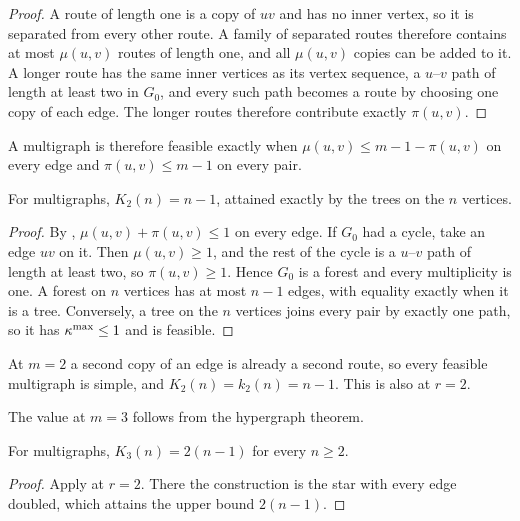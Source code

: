 \begin{proof}
A route of length one is a copy of $uv$ and has no inner vertex, so it is separated from every other route. A family of separated routes therefore contains at most $\mu(u,v)$ routes of length one, and all $\mu(u,v)$ copies can be added to it.
A longer route has the same inner vertices as its vertex sequence, a $u$--$v$ path of length at least two in $G_0$, and every such path becomes a route by choosing one copy of each edge. The longer routes therefore contribute exactly $\pi(u,v)$.
\end{proof}

A multigraph is therefore feasible exactly when $\mu(u,v) \le m-1-\pi(u,v)$ on every edge and $\pi(u,v) \le m-1$ on every pair.

\begin{corollary}[The multigraph vertex value at $m = 2$]\label{cor:multi-vertex-m2}
For multigraphs, $K_2(n) = n-1$, attained exactly by the trees on the $n$ vertices.
\end{corollary}

\begin{proof}
By , $\mu(u,v) + \pi(u,v) \le 1$ on every edge.
If $G_0$ had a cycle, take an edge $uv$ on it. Then $\mu(u,v) \ge 1$, and the rest of the cycle is a $u$--$v$ path of length at least two, so $\pi(u,v) \ge 1$.
Hence $G_0$ is a forest and every multiplicity is one.
A forest on $n$ vertices has at most $n-1$ edges, with equality exactly when it is a tree.
Conversely, a tree on the $n$ vertices joins every pair by exactly one path, so it has $\kappa^{\max}\le1$ and is feasible.
\end{proof}

\begin{remark}\label{rem:multi-vertex-m2-simple}
At $m = 2$ a second copy of an edge is already a second route, so every feasible multigraph is simple, and $K_2(n) = k_2(n) = n-1$. This is also  at $r = 2$.
\end{remark}

The value at $m=3$ follows from the hypergraph theorem.

\begin{corollary}[The multigraph vertex value at $m = 3$]\label{cor:multi-vertex-m3}
For multigraphs, $K_3(n) = 2(n-1)$ for every $n \ge 2$.
\end{corollary}

\begin{proof}
Apply  at $r=2$.
There the construction is the star with every edge doubled, which attains the upper bound $2(n-1)$.
\end{proof}

